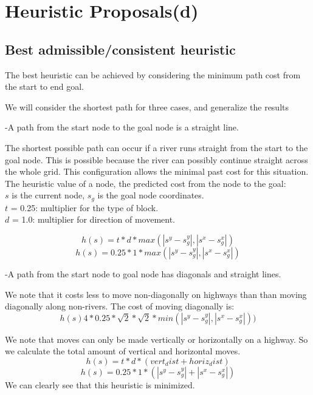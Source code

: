 \section{Heuristic Proposals(d)}



\subsection{Best admissible/consistent heuristic}

The best heuristic can be achieved by considering the minimum path cost from the start to end goal.

We will consider the shortest path for three cases, and generalize the results 

-A path from the start node to the goal node is a straight line.

The shortest possible path can occur if a river runs straight from the start to the goal node. This is possible because the river can possibly continue straight across the whole grid. This configuration allows the minimal past cost for this situation. The heuristic value of a node, the predicted cost from the node to the goal:
\\ $s$ is the current node, $s_g$ is the goal node coordinates.
\\ $t$ = 0.25: multiplier for the type of block.
\\ $d$ = 1.0: multiplier for direction of movement.

\[h(s) = t * d  * max(|s^y - s_g^y|,|s^x - s_g^x|)\]
\[h(s) = 0.25 * 1 * max(|s^y - s_g^y|,|s^x - s_g^x|)\]


-A path from the start node to goal node has diagonals and straight lines.

We note that it costs less to move non-diagonally on highways than than moving diagonally along non-rivers. The cost of moving diagonally is:
\[h(s) 4 * 0.25 * \sqrt{2} * \sqrt{2} * min(|s^y - s_g^y|,|s^x - s_g^x|))\]

We note that moves can only be made vertically or horizontally on a highway. So we calculate the total amount of vertical and horizontal moves.
\[h(s) = t * d  * (vert_dist + horiz_dist) \]
\[h(s) = 0.25 * 1 * ( |s^y - s_g^y| + |s^x - s_g^x| )\]
We can clearly see that this heuristic is minimized.


